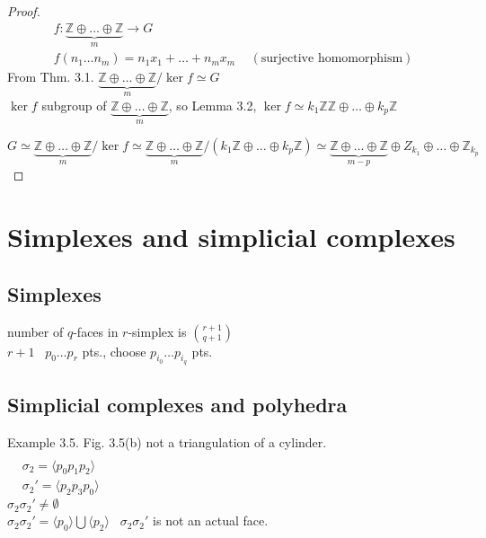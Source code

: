 \documentclass{book}
\begin{document}
\begin{proof}
\[
\begin{gathered}
  f: \underbrace{\mathbb{Z} \oplus \dots \oplus \mathbb{Z} }_{m} \to G \\ 
  f(n_1 \dots n_m) = n_1 x_1 + \dots + n_m x_m \quad \, (\text{surjective homomorphism})
\end{gathered}
\]
From Thm. 3.1. $ \underbrace{\mathbb{Z} \oplus \dots \oplus \mathbb{Z}}_{ m } / \ker{f} \simeq G$ \\

$\ker{f}$ subgroup of $\underbrace{ \mathbb{Z} \oplus \dots \oplus \mathbb{Z} }_{m}$, so Lemma 3.2, $\ker{f} \simeq k_1 \mathbb{Z} \mathbb{Z} \oplus \dots \oplus k_p \mathbb{Z}$  

\[
G \simeq \underbrace{ \mathbb{Z} \oplus \dots \oplus \mathbb{Z} }_{m} / \ker{f} \simeq \underbrace{ \mathbb{Z} \oplus \dots \oplus \mathbb{Z} }_{m} /(k_1 \mathbb{Z} \oplus \dots \oplus k_p \mathbb{Z} ) \simeq \underbrace{ \mathbb{Z} \oplus \dots \oplus \mathbb{Z} }_{m-p} \oplus Z_{k_1} \oplus \dots \oplus \mathbb{Z}_{k_p}
\]



\end{proof}



\section{Simplexes and simplicial complexes}

\subsection{Simplexes}

number of $q$-faces in $r$-simplex is $\binom{r+1}{q+1}$ \\

$r+1$ \, $p_0 \dots p_r$ pts., choose $p_{i_0} \dots p_{i_q}$ pts.  

\subsection{Simplicial complexes and polyhedra}

Example 3.5. Fig. 3.5(b) not a triangulation of a cylinder.  \\
$\begin{aligned} & \quad \\ 
  & \sigma_2 = \langle p_0 p_1 p_2 \rangle \\ 
  & \sigma_2' = \langle p_2 p_3 p_0 \rangle \end{aligned}$ \\
$\sigma_2 \sigma_2' \neq \emptyset$\\
$\sigma_2 \sigma_2' = \langle p_0 \rangle \bigcup \langle p_2 \rangle$ \quad \, $\sigma_2 \sigma_2'$ is not an actual face.  
\end{document}
